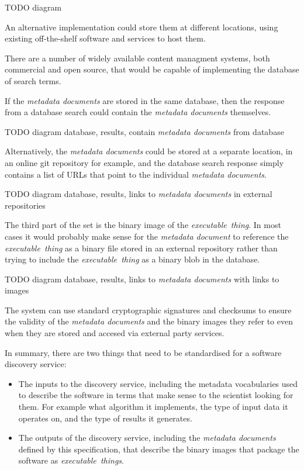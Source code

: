 \documentclass[11pt,a4paper]{ivoa}
\newcommand{\executablething}[1] {\textit{executable~thing#1}}
\newcommand{\metadoc} [1]{\textit{metadata document#1}}
\newcommand{\scientist}[1] {scientist#1}
\begin{document}
TODO diagram

An alternative implementation could store them at different locations, using
existing off-the-shelf software and services to host them.

There are a number of widely available content managment systems, both commercial
and open source, that would be capable of implementing the database of search terms.

If the \metadoc{s} are stored in the same database, then the response from a
database search could contain the \metadoc{s} themselves.

TODO diagram
database, results, contain \metadoc{s} from database

Alternatively, the \metadoc{s} could be stored at a separate location,
in an online git repository for example,
and the database search response simply contains a list of URLs that
point to the individual \metadoc{s}.

TODO diagram
database, results, links to \metadoc{s} in external repositories

The third part of the set is the binary image of the \executablething{}.
In most cases it would probably make sense for the \metadoc{} to reference
the \executablething{} as a binary file stored in an external repository
rather than trying to include the \executablething{} as a binary blob in
the database.

TODO diagram
database, results, links to \metadoc{s} with links to images

The system can use standard cryptographic signatures and checksums to ensure the validity
of the \metadoc{s} and the binary images they refer to even when they are stored and accesed
via external  party services.

In summary, there are two things that need to be standardised for a software discovery service:
\begin{itemize}
    \item The inputs to the discovery service, including the metadata vocabularies
        used to describe the software in terms that make sense to the \scientist{}
        looking for them. For example what algorithm it implements, the type of input data it
        operates on, and the type of results it generates.
    \item The outputs of the discovery service, including the \metadoc{s} defined by this
        specification, that describe the binary images that package the software
        as \executablething{s}.
\end{itemize}
\end{document}
